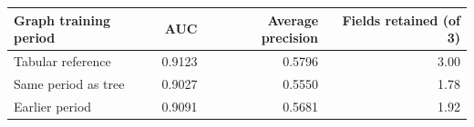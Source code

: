 \begin{tabular}{lrrr}
\toprule
Graph training period & AUC & Average precision & Fields retained (of 3) \\
\midrule
Tabular reference & 0.9123 & 0.5796 & 3.00 \\
Same period as tree & 0.9027 & 0.5550 & 1.78 \\
Earlier period & 0.9091 & 0.5681 & 1.92 \\
\bottomrule
\end{tabular}
